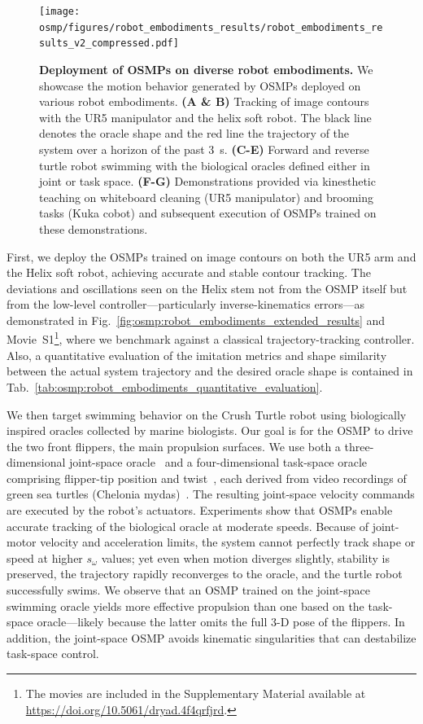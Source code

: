\begin{figure}
    \centering
    \texttt{[image: osmp/figures/robot\_embodiments\_results/robot\_embodiments\_results\_v2\_compressed.pdf]}
    \caption{\textbf{Deployment of \glspl{OSMP} on diverse robot embodiments.}
    We showcase the motion behavior generated by \glspl{OSMP} deployed on various robot embodiments.
    \textbf{(A \& B)} Tracking of image contours with the UR5 manipulator and the helix soft robot. The black line denotes the oracle shape and the red line the trajectory of the system over a horizon of the past $3$~s.
    \textbf{(C-E)} Forward and reverse turtle robot swimming with the biological oracles defined either in joint or task space.
    \textbf{(F-G)} Demonstrations provided via kinesthetic teaching on whiteboard cleaning (UR5 manipulator) and brooming tasks (Kuka cobot) and subsequent execution of \glspl{OSMP} trained on these demonstrations.
    }
    \label{fig:osmp:robot_embodiments_results}
\end{figure}

First, we deploy the \glspl{OSMP} trained on image contours on both the UR5 arm and the Helix soft robot, achieving accurate and stable contour tracking. The deviations and oscillations seen on the Helix stem not from the \gls{OSMP} itself but from the low-level controller—particularly inverse-kinematics errors—as demonstrated in Fig.~\ref{fig:osmp:robot_embodiments_extended_results} and Movie~S1\footnote{The movies are included in the Supplementary Material available at \url{https://doi.org/10.5061/dryad.4f4qrfjrd}.}, where we benchmark against a classical trajectory-tracking controller.
Also, a quantitative evaluation of the imitation metrics and shape similarity between the actual system trajectory and the desired oracle shape is contained in Tab.~\ref{tab:osmp:robot_embodiments_quantitative_evaluation}.

We then target swimming behavior on the Crush Turtle robot using biologically inspired oracles collected by marine biologists. Our goal is for the \gls{OSMP} to drive the two front flippers, the main propulsion surfaces. We use both a three-dimensional joint-space oracle~\citep{van2023soft} and a four-dimensional task-space oracle comprising flipper-tip position and twist~\citep{van2022new}, each derived from video recordings of green sea turtles (Chelonia mydas)~\citep{van2022new,van2023soft}. The resulting joint-space velocity commands are executed by the robot’s actuators. Experiments show that \glspl{OSMP} enable accurate tracking of the biological oracle at moderate speeds. Because of joint-motor velocity and acceleration limits, the system cannot perfectly track shape or speed at higher $s_\omega$ values; yet even when motion diverges slightly, stability is preserved, the trajectory rapidly reconverges to the oracle, and the turtle robot successfully swims. 
We observe that an \gls{OSMP} trained on the joint-space swimming oracle yields more effective propulsion than one based on the task-space oracle—likely because the latter omits the full 3-D pose of the flippers. In addition, the joint-space \gls{OSMP} avoids kinematic singularities that can destabilize task-space control.

